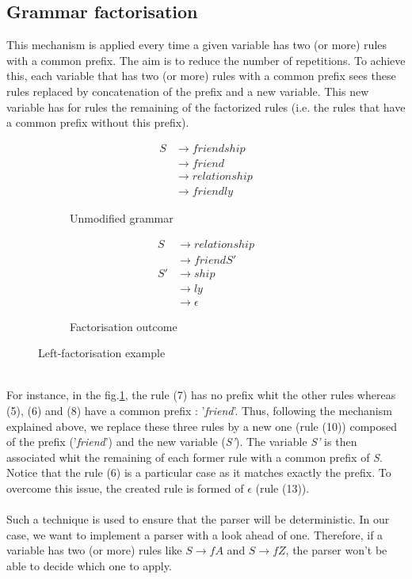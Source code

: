 \documentclass[a4paper,11pt]{article}
\begin{document}
  \subsection{Grammar factorisation}
    \label{sec:factorisation}
    This mechanism is applied every time a given variable has two (or more) rules with a common prefix. The aim is to reduce the number of repetitions. To achieve this, each variable that has two (or more) rules with a common prefix sees these rules replaced by concatenation of the prefix and a new variable. This new variable has for rules the remaining of the factorized rules (i.e. the rules that have a common prefix without this prefix).
    \begin{figure}[h!]
	  \begin{subfigure}[b]{0.4\textwidth}
	      \centering
	      \begin{align}
		S &\rightarrow friendship \\
		  &\rightarrow friend \\
		  &\rightarrow relationship \\
		  &\rightarrow friendly
	      \end{align}
	      \caption{Unmodified grammar}
	      \label{fig:unmodifiedgrammar1}
	  \end{subfigure}%
	  \begin{subfigure}[b]{0.4\textwidth}
	      \centering
	      \begin{align}
		S  &\rightarrow relationship \\
		    &\rightarrow friendS' \\
		S' &\rightarrow ship \\
		    &\rightarrow ly \\
		    &\rightarrow \epsilon
	      \end{align}
	      \caption{Factorisation outcome}
	      \label{fig:resultinggrammar1}
	  \end{subfigure}
	  \caption{Left-factorisation example}
      \end{figure}\\
      For instance, in the fig.\ref{fig:unmodifiedgrammar1}, the rule (7) has no prefix whit the other rules whereas (5), (6) and (8) have a common prefix : '\textit{friend}'. Thus, following the mechanism explained above, we replace these three rules by a new one (rule (10)) composed of the prefix ('\textit{friend}') and the new variable (\textit{S'}). The variable \textit{S'} is then associated whit the remaining of each former rule with a common prefix of \textit{S}. Notice that the rule (6) is a particular case as it matches exactly the prefix. To overcome this issue, the created rule is formed of $\epsilon$ (rule (13)).\\\\
      Such a technique is used to ensure that the parser will be deterministic. In our case, we want to implement a parser with a look ahead of one. Therefore, if a variable has two (or more) rules like $S \rightarrow fA$ and $S \rightarrow fZ$, the parser won't be able to decide which one to apply.
\end{document}
